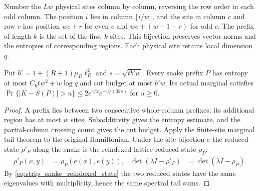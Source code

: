 \begin{definition}
    \label{def:strip_snake}
    \leanok
    Number the $Lw$ physical sites column by column, reversing the row
    order in each odd column. The position $i$ lies in column $\lfloor i/w\rfloor$,
    and the site in column $c$ and row $r$ has position $wc+r$ for even $c$
    and $wc+(w-1-r)$ for odd $c$. The prefix of length $k$ is the set of
    the first $k$ sites.
    This bijection preserves vector norms and the entropies of corresponding
    regions. Each physical site retains local dimension $q$.
\end{definition}

\begin{lemma}
    \label{lem:strip_prefix_tails}
    \leanok
    Put $b'=1+(R+1)\mu_R\ell_R^2$ and $s=\sqrt{tb'w}$.
    Every snake prefix $P$ has entropy at most $C_0tw^2+w\log q$ and
    cut budget at most $b'w$. Its actual marginal satisfies
    $\Pr\{|K-S(P)|>u\}\le2e^{e/2}e^{-u/(32s)}$ for $u\ge0$.
\end{lemma}
\begin{proof}
    \leanok
    A prefix lies between two consecutive whole-column prefixes; its
    additional region has at most $w$ sites. Subadditivity gives the entropy
    estimate, and the partial-column crossing count gives the cut budget.
    Apply the finite-site marginal tail theorem to the original Hamiltonian.
    Under the site bijection $e$ the reduced state $\rho'_P$ along the snake
    is the reindexed lattice reduced state $\rho_P$:
    \begin{align}
        \rho'_P(x,y) & =\rho_P(e(x),e(y)),
                     & \det(\lambda I-\rho'_P)
                     & =\det(\lambda I-\rho_P).
        \label{eq:strip_snake_reindexed_state}
    \end{align}
    By \eqref{eq:strip_snake_reindexed_state} the two reduced states have the
    same eigenvalues with multiplicity, hence the same spectral tail sums.
\end{proof}

